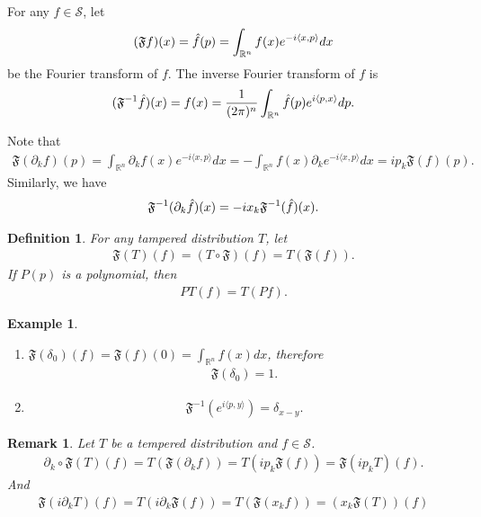 \documentclass[a4paper,10pt]{amsart}
\newtheorem{example}{Example}[section]
\newtheorem{definition}{Definition}[section]
\newtheorem{remark}{Remark}[section]
\newcommand{\SSS}{\mathcal S}
\newcommand{\FFF}{\mathfrak F}
\newcommand{\R}{\mathbb R}  %
\begin{document}
For any $f \in \SSS$, let 
\begin{align*}
    (\FFF f)(x) 
    = \Hat{f}(p) = \int_{\R^{n}} f(x)e^{-i \langle x, p \rangle} dx 
\end{align*}
be the Fourier transform of $f$. The inverse Fourier transform of $f$ is
\begin{align*}
    (\FFF^{-1} \Hat{f})(x) = f(x) = \frac{1}{(2\pi)^n}
    \int_{\R^n} \Hat{f}(p)e^{i \langle p, x \rangle} dp. 
\end{align*}

Note that
\begin{align*}
    \FFF(\partial_k f)(p) = 
\int_{\R^{n}} \partial_k f(x)e^{-i \langle x, p \rangle } dx= 
-\int_{\R^{n}} f(x)\partial_{k} e^{-i \langle x, p \rangle } dx =
i p_{k} \FFF(f)(p).
\end{align*}
Similarly, we have
\begin{align*}
    \FFF^{-1}(\partial_k \Hat{f})(x) = -ix_{k} \FFF^{-1}(\Hat{f})(x). 
\end{align*}

\begin{definition}
   For any tampered distribution $T$, let
   \begin{align*}
       \FFF(T)(f) = (T \circ \FFF)(f) = T(\FFF(f)).
   \end{align*}
   If $P(p)$ is a polynomial, then
   \begin{align*}
       PT(f) = T(Pf). 
   \end{align*}
\end{definition}

\begin{example}
   \begin{enumerate}
       \item $\FFF(\delta_0)(f) = \FFF(f)(0) = 
           \int_{\R^{n}}f(x) dx$, therefore 
           \begin{align*}
           \FFF(\delta_0) = 1.
           \end{align*}
        \item
            \begin{align*}
                \FFF^{-1}(e^{i \langle p, y \rangle}) = \delta_{x-y}. 
            \end{align*}
   \end{enumerate} 
\end{example}

\begin{remark}
   Let $T$ be a tempered distribution and $f \in \SSS$. 
   \begin{align*}
       \partial_{k} \circ \FFF(T)(f) = T(\FFF (\partial_{k} f)) = 
       T(ip_{k}\FFF(f)) = \FFF (ip_{k} T)(f). 
   \end{align*}
   And
   \begin{align*}
       \FFF(i \partial_{k}T)(f) = T(i\partial_{k}\FFF(f)) 
       = T(\FFF(x_k f)) = (x_k \FFF(T)) (f)
   \end{align*}
\end{remark}
\end{document}
